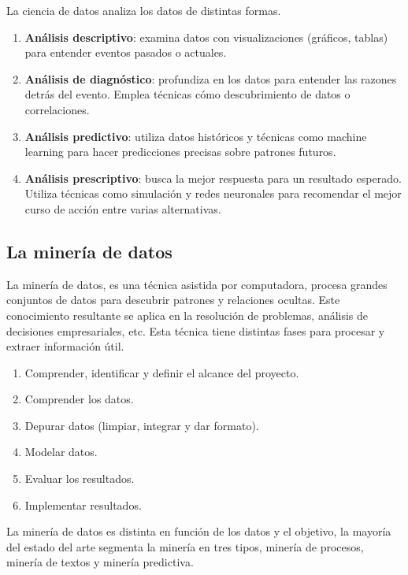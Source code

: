 La ciencia de datos analiza los datos de distintas formas.

\begin{enumerate}
    \item \textbf{Análisis descriptivo}: examina datos con visualizaciones (gráficos, tablas) para entender eventos pasados o actuales.
    \item \textbf{Análisis de diagnóstico}: profundiza en los datos para entender las razones detrás del evento. Emplea técnicas cómo descubrimiento de datos o correlaciones.
    \item \textbf{Análisis predictivo}: utiliza datos históricos y técnicas como machine learning para hacer predicciones precisas sobre patrones futuros.
    \item \textbf{Análisis prescriptivo}: busca la mejor respuesta para un resultado esperado. Utiliza técnicas como simulación y redes neuronales para recomendar el mejor curso de acción entre varias alternativas.
\end{enumerate}


\subsection{La minería de datos}

La minería de datos, es una técnica asistida por computadora, procesa grandes conjuntos de datos para descubrir patrones y relaciones ocultas. Este conocimiento resultante se aplica en la resolución de problemas, análisis de decisiones empresariales, etc. Esta técnica tiene distintas fases para procesar y extraer información útil.

\begin{enumerate}
    \item Comprender, identificar y definir el alcance del proyecto.
    \item Comprender los datos.
    \item Depurar datos (limpiar, integrar y dar formato).
    \item Modelar datos.
    \item Evaluar los resultados.
    \item Implementar resultados.
\end{enumerate}

La minería de datos es distinta en función de los datos y el objetivo, la mayoría del estado del arte segmenta la minería en tres tipos, minería de procesos, minería de textos y minería predictiva.

